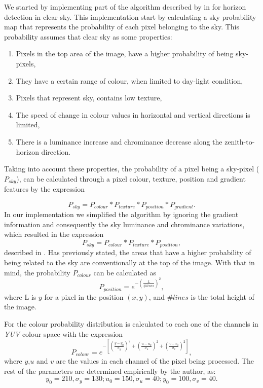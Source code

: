 We started by implementing part of the algorithm described by \citeauthor{zafarifar2008horizon} in \cite{zafarifar2008horizon} for horizon detection in clear sky. This implementation start by calculating a sky probability map that represents the probability of each pixel belonging to the sky. This probability assumes that clear sky as some properties:
\begin{enumerate}
	\item Pixels in the top area of the image, have a higher probability of being sky-pixels,
	\item They have a certain range of colour, when limited to day-light condition,
	\item Pixels that represent sky, contains low texture,
	\item The speed of change in colour values in horizontal and vertical directions is limited,
	\item There is a luminance increase and chrominance decrease along the zenith-to-horizon direction.
\end{enumerate}
Taking into account these properties, the probability of a pixel being a sky-pixel ($P_{sky}$), can be calculated through a pixel colour, texture, position and gradient features by the expression

\begin{equation}
	P_{sky} = P_{colour} * P_{texture} * P_{position} * P_{gradient}.
	\label{eq:cd_eq}
\end{equation}
In our implementation we simplified the algorithm by ignoring the gradient information and consequently the sky luminance and chrominance variations, which resulted in the expression
\begin{equation}
	P_{sky} = P_{colour} * P_{texture} * P_{position},
\end{equation}
described in \cite{herman2003adaptive}. Has previously stated, the areas that have a higher probability of being related to the sky are conventionally at the top of the image. With that in mind, the probability $P_{colour}$ can be calculated as
\begin{equation}
	P_{position} = e^{- \left( \frac{L}{\#lines} \right)^2},
	\label{eq:colour_sky}
\end{equation}
where L is $y$ for a pixel in the position $(x,y)$, and $\#lines$ is the total height of the image.

For the colour probability distribution is calculated to each one of the channels in \emph{YUV} colour space with the expression
\begin{equation}
	P_{colour} =  e^{- \left[ \left(\frac{y-y_{0}}{\sigma_{y}} \right)^2 + \left(\frac{u-u_{0}}{\sigma_{u}} \right)^2 + \left(\frac{v-v_{0}}{\sigma_{v}} \right)^2\right]},
\end{equation}
where $y$,$u$ and $v$ are the values in each channel of the pixel being processed. The rest of the parameters are determined empirically by the author, as:
\begin{equation}
	y_{0} = 210, \sigma_{y}=130;
	u_{0} = 150, \sigma_{u}=40;
	y_{0} = 100, \sigma_{v}=40.
\end{equation}


